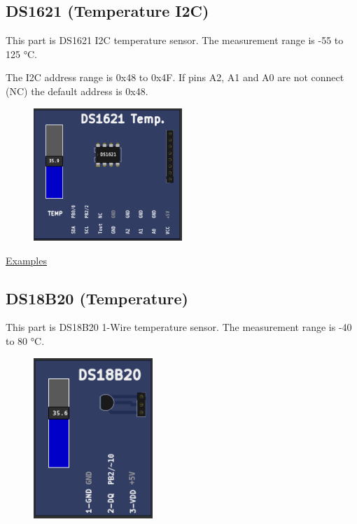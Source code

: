 \vspace{0.5cm}

  
\subsection{DS1621 (Temperature I2C)}


This part is DS1621 I2C temperature sensor. The measurement range is -55 to 125 °C.

The I2C address range is 0x48 to 0x4F. If pins A2, A1 and A0 are not connect (NC) the default address is 0x48.  

\begin{figure}[H]
\center
\includegraphics[width=0.5\textwidth]{img/part_ds1621.png} 
\end{figure} 


\href{https://lcgamboa.github.io/picsimlab_examples/parts_DS1621_(Temperature_I2C).html}{Examples}

\vspace{0.5cm}

\subsection{DS18B20 (Temperature)}

This part is DS18B20 1-Wire temperature sensor. The measurement range is -40 to 80 °C.

\begin{figure}[H]
\center
\includegraphics[width=0.4\textwidth]{img/part_ds18b20.png} 
\end{figure} 


